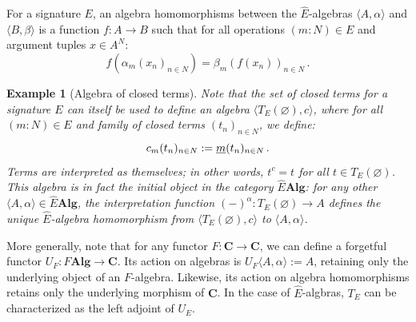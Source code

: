 \documentclass[11pt,oneside,draft]{book}
\newtheorem{example}[theorem]{Example}
\theoremstyle{definition}
\newcommand{\ul}[1]{%
  \underline{\smash{#1}}
}
\begin{document}
For a signature $E$,
an algebra homomorphisms
between the $\hat{E}$-algebras
$\langle A, \alpha \rangle$ and
$\langle B, \beta \rangle$
is a function $f : A \rightarrow B$ such that
for all operations $(m \mathop{:} N) \in E$
and argument tuples $x \in A^N$:
\[
  f(\alpha_m(x_n)_{n \in N}) = \beta_m(f(x_n))_{n \in N} \,.
\]

\begin{example}[Algebra of closed terms]
Note that the set of closed terms for a signature $E$
can itself be used to define an algebra
$\langle T_E(\varnothing), c \rangle$,
where for all $(m \mathop{:} N) \in E$ and
family of closed terms $(t_n)_{n \in N}$,
we define:
\[
  c_m(t_n)_{n \in N} := \ul{m}(t_n)_{n \in N}
  \,.
\]
Terms are interpreted as themselves;
in other words, $t^c = t$ for all $t \in T_E(\varnothing)$.
This algebra is in fact the \emph{initial object}
in the category $\hat{E} \mathbf{Alg}$:
for any other
$\langle A, \alpha \rangle \in \hat{E} \mathbf{Alg}$,
the interpretation function
$(-)^\alpha : T_E(\varnothing) \rightarrow A$
defines the unique $\hat{E}$-algebra homomorphism
from $\langle T_E(\varnothing), c \rangle$ to
$\langle A, \alpha \rangle$.
\end{example}

More generally,
note that for any functor $F : \mathbf{C} \rightarrow \mathbf{C}$,
we can define a forgetful functor
$U_F : F \mathbf{Alg} \rightarrow \mathbf{C}$.
Its action on algebras is
$U_F \langle A, \alpha \rangle := A$,
retaining only the underlying object of an $F$-algebra.
Likewise,
its action on algebra homomorphisms
retains only the underlying morphism of $\mathbf{C}$.
In the case of $\hat{E}$-algbras,
$T_E$ can be characterized as the left adjoint of $U_E$.
\end{document}
